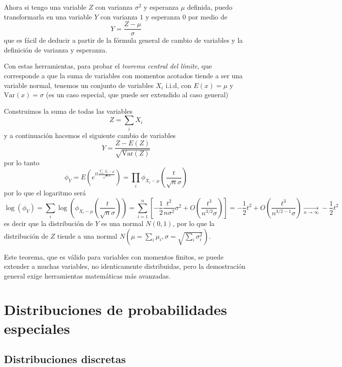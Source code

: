 \documentclass{article}
\numberwithin{equation}{section} %
\begin{document}
Ahora si tengo una variable $Z$ con varianza $\sigma^2$ y esperanza $\mu$ definida, puedo transformarla en una variable $Y$ con varianza $1$ y esperanza $0$ por medio de
\begin{equation}
Y = \frac{Z - \mu}{\sigma}
\end{equation}
que es fácil de deducir a partir de la fórmula general de cambio de variables y la definición de varianza y esperanza.


Con estas herramientas, para probar el \emph{teorema central del límite}, que corresponde a que la suma de variables con momentos acotados tiende a ser una variable normal, tenemos un conjunto de variables $X_i$ i.i.d, con $E(x) = \mu$ y $\text{Var}(x) = \sigma$ (es un caso especial, que puede ser extendido al caso general)

Construimos la suma de todas las variables \[Z = \sum_{i} X_i \]
y a continuación hacemos el siguiente cambio de variables 
\[Y = \frac{Z - E(Z)}{\sqrt{\text{Var}(Z)}} \]
por lo tanto 
\[ \phi_{Y} = E\left(e^{i t \frac{\sum_{i} X_i - \mu}{\sqrt{n} \sigma}}\right) = \prod_i \phi_{X_i - \mu}\left(\frac{t}{\sqrt{n} \sigma}\right)\]
por lo que el logaritmo será
\[\log(\phi_{Y}) = \sum_i \log\left(\phi_{X_i - \mu}\left(\frac{t}{\sqrt{n} \sigma}\right) \right) = \sum^{n}_{i=1} \left[ -\frac{1}{2} \frac{t^2}{n \sigma^2} \sigma^2 + O\left(\frac{t^3}{n^{3/2} \sigma}\right) \right] = -\frac{1}{2} t^2 + O\left(\frac{t^3}{n^{3/2 - 1} \sigma}\right) \xrightarrow[n\to\infty]{}  -\frac{1}{2} t^2\]
es decir que la distribución de $Y$ es una normal $N(0,1)$, por lo que la distribución de $Z$ tiende a una normal $N(\mu = \sum_i \mu_i, \sigma = \sqrt{\sum_i \sigma^2_i})$.

Este teorema, que es válido para variables con momentos finitos, se puede extender a muchas variables, no identicamente distribuidas, pero la demostración general exige herramientas matemáticas más avanzadas.


\section{Distribuciones de probabilidades especiales}
\subsection{Distribuciones discretas}
\end{document}
